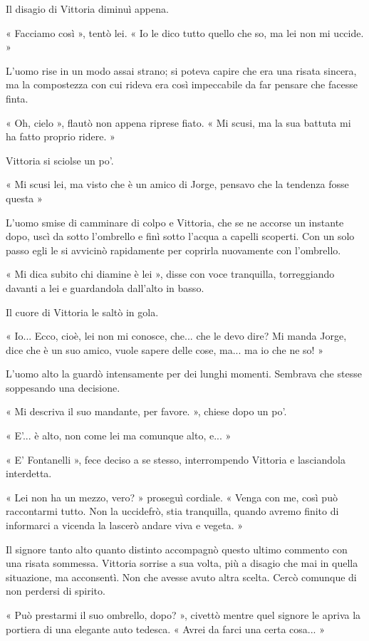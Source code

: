 Il disagio di Vittoria diminuì appena.

« Facciamo così », tentò lei. « Io le dico tutto quello che so, ma lei non mi uccide. »

L'uomo rise in un modo assai strano; si poteva capire che era una risata sincera, ma la compostezza con cui rideva era così impeccabile da far pensare che facesse finta.

« Oh, cielo », flautò non appena riprese fiato. « Mi scusi, ma la sua battuta mi ha fatto proprio ridere. »

Vittoria si sciolse un po'.

« Mi scusi lei, ma visto che è un amico di Jorge, pensavo che la tendenza fosse questa »

L'uomo smise di camminare di colpo e Vittoria, che se ne accorse un instante dopo, uscì da sotto l'ombrello e finì sotto l'acqua a capelli scoperti. Con un solo passo egli le si avvicinò rapidamente per coprirla nuovamente con l'ombrello.

« Mi dica subito chi diamine è lei », disse con voce tranquilla, torreggiando davanti a lei e guardandola dall'alto in basso.

Il cuore di Vittoria le saltò in gola.

« Io... Ecco, cioè, lei non mi conosce, che... che le devo dire? Mi manda Jorge, dice che è un suo amico, vuole sapere delle cose, ma... ma io che ne so! »

L'uomo alto la guardò intensamente per dei lunghi momenti. Sembrava che stesse soppesando una decisione.

« Mi descriva il suo mandante, per favore. », chiese dopo un po'.

« E'... è alto, non come lei ma comunque alto, e... »

« E' Fontanelli », fece deciso a se stesso, interrompendo Vittoria e lasciandola interdetta.

« Lei non ha un mezzo, vero? » proseguì cordiale. « Venga con me, così può raccontarmi tutto. Non la uccidefrò, stia tranquilla, quando avremo finito di informarci a vicenda la lascerò andare viva e vegeta. »

Il signore tanto alto quanto distinto accompagnò questo ultimo commento con una risata sommessa. Vittoria sorrise a sua volta, più a disagio che mai in quella situazione, ma acconsentì. Non che avesse avuto altra scelta. Cercò comunque di non perdersi di spirito.

« Può prestarmi il suo ombrello, dopo? », civettò mentre quel signore le apriva la portiera di una elegante auto tedesca. «  Avrei da farci una certa cosa... »


